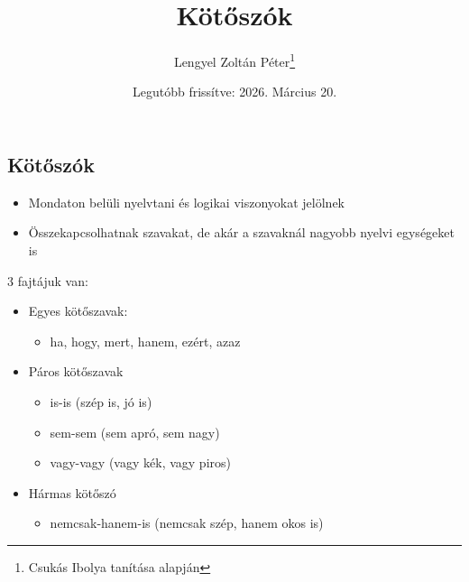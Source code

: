\documentclass{article}
\title{Kötőszók}
\author{Lengyel Zoltán Péter\thanks{Csukás Ibolya tanítása alapján}}
\date{Legutóbb frissítve: 2026. Március 20.}
\begin{document}
\maketitle
\tableofcontents
\newpage

\begin{center}
    \section{Kötőszók}
\end{center}

\begin{itemize}
    \item Mondaton belüli nyelvtani és logikai viszonyokat jelölnek
    \item Összekapcsolhatnak szavakat, de akár a szavaknál nagyobb nyelvi egységeket is
\end{itemize}

3 fajtájuk van:
\begin{itemize}

    \item Egyes kötőszavak: 
    \begin{itemize}
        \item ha, hogy, mert, hanem, ezért, azaz
    \end{itemize}
    
    \item Páros kötőszavak 
    \begin{itemize}
        \item is-is (szép is, jó is)
        \item sem-sem (sem apró, sem nagy)
        \item vagy-vagy (vagy kék, vagy piros)
    \end{itemize}
    
    \item Hármas kötőszó 
    \begin{itemize}
        \item nemcsak-hanem-is (nemcsak szép, hanem okos is)
    \end{itemize}
    
\end{itemize}
\end{document}
